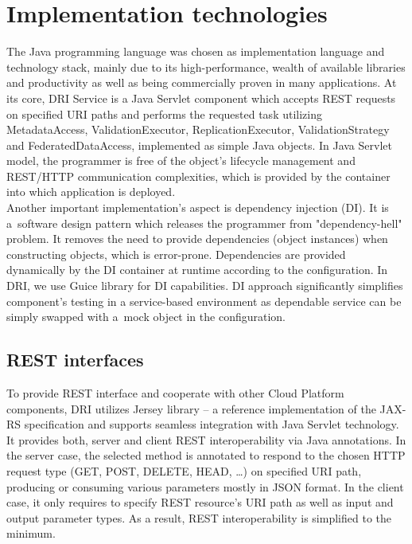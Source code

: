 	\section{Implementation technologies}
The Java programming language \cite{java-language} was chosen as implementation
language and 
technology stack, mainly due to its high-performance, wealth of available
libraries and productivity as well as being commercially proven in many
applications. At its core, DRI Service is a Java Servlet \cite{java-servlet}
component which accepts REST requests on specified URI paths and performs the
requested task utilizing MetadataAccess, ValidationExecutor, 
ReplicationExecutor, ValidationStrategy and FederatedDataAccess, implemented as
simple Java objects. In Java Servlet model, the programmer is free of the
object's lifecycle management and REST/HTTP communication complexities, which
is provided by the container into which application is deployed.\\

Another important implementation's aspect is dependency injection (DI). It is
a~software design pattern which releases the programmer from "dependency-hell"
problem. It removes the need to provide dependencies (object instances) when
constructing objects, which is error-prone. Dependencies are provided
dynamically by the DI container at runtime according to the configuration.
In DRI, we use Guice library \cite{guice} for DI capabilities. DI approach
significantly simplifies component's testing in a service-based environment as
dependable service can be simply swapped with a~mock object in the
configuration.\\
 
		\subsection{REST interfaces}
To provide REST interface and cooperate with other Cloud Platform
components, DRI utilizes Jersey library \cite{jersey} -- a reference
implementation of the JAX-RS specification \cite{jax-rs} and supports seamless
integration with Java Servlet technology. It provides both, server and client
REST interoperability via Java annotations. In the server case, the selected
method is annotated to respond to the chosen HTTP request type (GET, POST,
DELETE, HEAD, \ldots) on specified URI path, producing or consuming various
parameters mostly in JSON format. In the client case, it only requires to
specify REST resource's URI path as well as input and output parameter types.
As a result, REST interoperability is simplified to the minimum.\\

